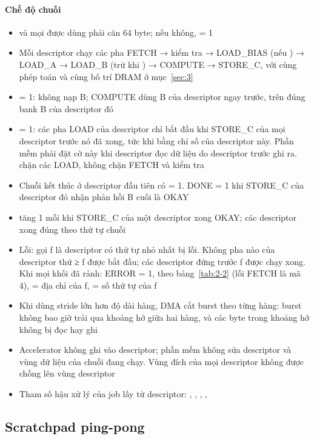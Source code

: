 \paragraph{Chế độ chuỗi}\label{par:5-5}
\begin{itemize}
\item {} và mọi  được dùng phải căn 64 byte; nếu không,  = 1
\item Mỗi descriptor chạy các pha FETCH → kiểm tra → LOAD\_BIAS (nếu ) → LOAD\_A → LOAD\_B (trừ khi ) → COMPUTE → STORE\_C, với cùng phép toán và cùng bố trí DRAM ở mục~\ref{sec:3}
\item {} = 1: không nạp B; COMPUTE dùng B của descriptor ngay trước, trên đúng bank B của descriptor đó
\item {} = 1: các pha LOAD của descriptor chỉ bắt đầu khi STORE\_C của mọi descriptor trước nó đã xong, tức khi  bằng chỉ số của descriptor này. Phần mềm phải đặt cờ này khi descriptor đọc dữ liệu do descriptor trước ghi ra.  chặn các LOAD, không chặn FETCH và kiểm tra
\item Chuỗi kết thúc ở descriptor đầu tiên có  = 1. DONE = 1 khi STORE\_C của descriptor đó nhận phản hồi B cuối là OKAY
\item {} tăng 1 mỗi khi STORE\_C của một descriptor xong OKAY; các descriptor xong đúng theo thứ tự chuỗi
\item Lỗi: gọi f là descriptor có thứ tự nhỏ nhất bị lỗi. Không pha nào của descriptor thứ ≥ f được bắt đầu; các descriptor đứng trước f được chạy xong. Khi mọi khối đã rảnh: ERROR = 1,  theo bảng~\ref{tab:2-2} (lỗi FETCH là mã 4),  = địa chỉ của f,  = số thứ tự của f
\item Khi dùng stride lớn hơn độ dài hàng, DMA cắt burst theo từng hàng: burst không bao giờ trải qua khoảng hở giữa hai hàng, và các byte trong khoảng hở không bị đọc hay ghi
\item Accelerator không ghi vào descriptor; phần mềm không sửa descriptor và vùng dữ liệu của chuỗi đang chạy. Vùng đích của mọi descriptor không được chồng lên vùng descriptor
\item Tham số hậu xử lý của job lấy từ descriptor: , , , , 
\end{itemize}

\subsection{Scratchpad ping-pong}\label{sec:5.3}

